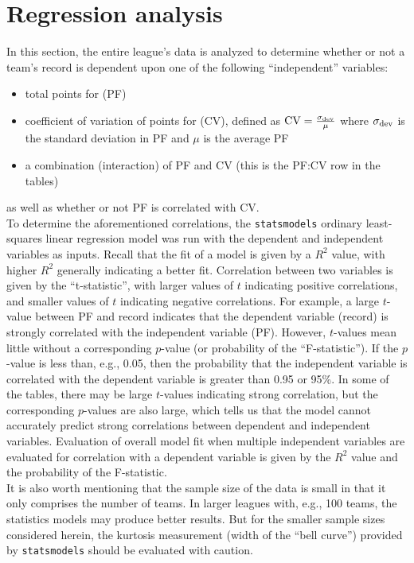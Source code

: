 \documentclass[12pt,letterpaper]{article}
\begin{document}
\section{Regression analysis}
\label{sec:reg}
In this section, the entire league's data is analyzed to determine whether or not a team's record is dependent upon one of the following ``independent'' variables:
\begin{itemize}
  \item total points for (PF)
  \item coefficient of variation of points for (CV), defined as $\text{CV} = \frac{\sigma_{\rm{dev}}}{\mu}$ where $\sigma_{\rm{dev}}$ is the standard deviation in PF and $\mu$ is the average PF
  \item a combination (interaction) of PF and CV (this is the PF:CV row in the tables)
\end{itemize}
as well as whether or not PF is correlated with CV.\\

To determine the aforementioned correlations, the \texttt{statsmodels} ordinary least-squares linear regression model was run with the dependent and independent variables as inputs. Recall that the fit of a model is given by a $R^2$ value, with higher $R^2$ generally indicating a better fit. Correlation between two variables is given by the ``t-statistic'', with larger values of $t$ indicating positive correlations, and smaller values of $t$ indicating negative correlations. For example, a large $t$-value between PF and record indicates that the dependent variable (record) is strongly correlated with the independent variable (PF). However, $t$-values mean little without a corresponding $p$-value (or probability of the ``F-statistic''). If the $p$-value is less than, e.g., 0.05, then the probability that the independent variable is correlated with the dependent variable is greater than 0.95 or 95\%. In some of the tables, there may be large $t$-values indicating strong correlation, but the corresponding $p$-values are also large, which tells us that the model cannot accurately predict strong correlations between dependent and independent variables. Evaluation of overall model fit when multiple independent variables are evaluated for correlation with a dependent variable is given by the $R^2$ value and the probability of the F-statistic.\\

It is also worth mentioning that the sample size of the data is small in that it only comprises the number of teams. In larger leagues with, e.g., 100 teams, the statistics models may produce better results. But for the smaller sample sizes considered herein, the kurtosis measurement (width of the ``bell curve'') provided by \texttt{statsmodels} should be evaluated with caution.
\end{document}
